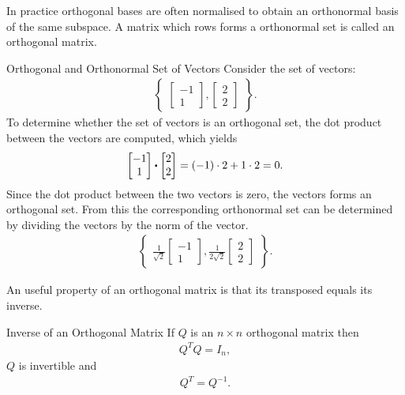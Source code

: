 In practice orthogonal bases are often normalised to obtain an orthonormal basis of the same subspace. A matrix which rows forms a orthonormal set is called an orthogonal matrix.

\begin{example}{Orthogonal and Orthonormal Set of Vectors}
    Consider the set of vectors:
    \begin{align*}
    \begin{Bmatrix}
    \begin{bmatrix}
        -1\\1
    \end{bmatrix},
    \begin{bmatrix}
        2\\2
    \end{bmatrix}
    \end{Bmatrix}.
    \end{align*}
    To determine whether the set of vectors is an orthogonal set, the dot product between the vectors are computed, which yields
    \begin{align*}
    \begin{bmatrix}
        -1\\1
    \end{bmatrix}\vprik
    \begin{bmatrix}
        2\\2
    \end{bmatrix}=(-1)\cdot2+1\cdot2=0.
    \end{align*}
    Since the dot product between the two vectors is zero, the vectors forms an orthogonal set.
    From this the corresponding orthonormal set can be determined by dividing the vectors by the norm of the vector. 
    \begin{align*}
    \begin{Bmatrix}
    \frac{1}{\sqrt{2}}
    \begin{bmatrix}
        -1\\1
    \end{bmatrix},
    \frac{1}{2\sqrt{2}}
    \begin{bmatrix}
        2\\2
    \end{bmatrix}
    \end{Bmatrix}.
    \end{align*}
\end{example}
An useful property of an orthogonal matrix is that its transposed equals its inverse.
\begin{theorem}{Inverse of an Orthogonal Matrix}
    If $Q$ is an $n\times n$ orthogonal matrix then
    \begin{align*}
        Q^T Q = I_n,
    \end{align*}
    $Q$ is invertible and
    \begin{align*}
        Q^T = Q^{-1}.
    \end{align*}
    \cite[413]{LiAl}
\end{theorem}
